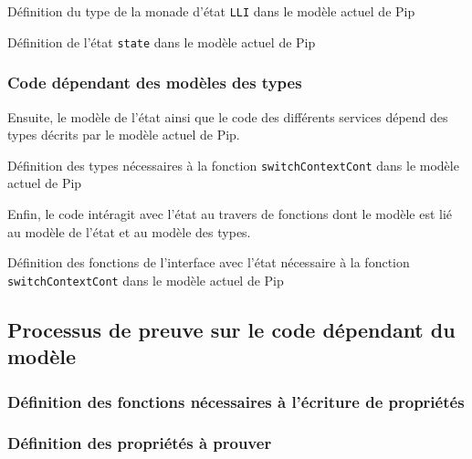 		\begin{listing}[!ht]
			\caption{Définition du type de la monade d'état \texttt{LLI} dans le modèle actuel de Pip}
			\label{code:LLImonad}
		\end{listing}

		\begin{listing}[!ht]
			\caption{Définition de l'état \texttt{state} dans le modèle actuel de Pip}
			\label{code:CurrentIsolationState}
		\end{listing}

			\subsubsection{Code dépendant des modèles des types}
		
		Ensuite, le modèle de l'état ainsi que le code des différents services dépend des types décrits par le modèle actuel de Pip.

		\begin{listing}[!ht]
			\caption{Définition des types nécessaires à la fonction \texttt{switchContextCont} dans le modèle actuel de Pip}
			\label{code:CurrentTypesModel}
		\end{listing}

		Enfin, le code intéragit avec l'état au travers de fonctions dont le modèle est lié au modèle de l'état et au modèle des types.

		\begin{listing}[!ht]
			\caption{Définition des fonctions de l'interface avec l'état nécessaire à la fonction \texttt{switchContextCont} dans le modèle actuel de Pip}
			\label{code:CurrentFunctionsModel}
		\end{listing}

		\subsection{Processus de preuve sur le code dépendant du modèle}

			\subsubsection{Définition des fonctions nécessaires à l'écriture de propriétés}

			\subsubsection{Définition des propriétés à prouver}

